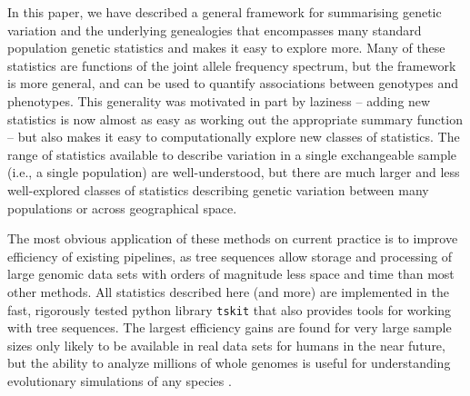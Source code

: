 \documentclass{article}
\newcommand{\tskit}{{\texttt{tskit}}}
\begin{document}
In this paper, we have described a general framework for summarising genetic variation
and the underlying genealogies
that encompasses many standard population genetic statistics
and makes it easy to explore more.
Many of these statistics are functions of the joint allele frequency spectrum,
but the framework is more general,
and can be used to quantify associations between genotypes and phenotypes.
This generality was motivated in part by laziness --
adding new statistics is now almost as easy as working out the appropriate summary function --
but also makes it easy to computationally explore new classes of statistics.
The range of statistics available to describe variation in a single exchangeable sample
(i.e., a single population) are well-understood,
but there are much larger and less well-explored classes of statistics
describing genetic variation between many populations
or across geographical space.

The most obvious application of these methods on current practice
is to improve efficiency of existing pipelines,
as tree sequences allow storage and processing of large genomic data sets
with orders of magnitude less space and time than most other methods.
All statistics described here (and more) are implemented
in the fast, rigorously tested python library \tskit{}
that also provides tools for working with tree sequences.
The largest efficiency gains are found for very large sample sizes
only likely to be available in real data sets for humans in the near future,
but the ability to analyze millions of whole genomes
is useful for understanding evolutionary simulations of any species
\citep[see][for a recent example]{galloway2019stickleback}.
\end{document}
